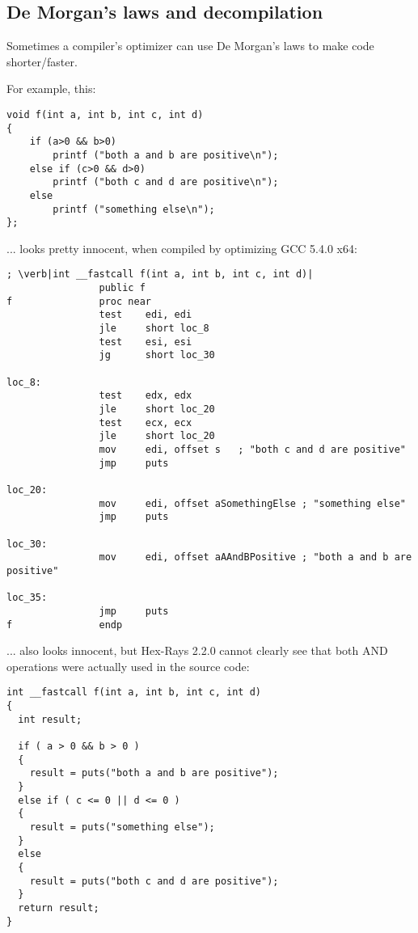 \subsection{De Morgan's laws and decompilation}

Sometimes a compiler's optimizer can use De Morgan's laws to make code shorter/faster.

For example, this:

\begin{lstlisting}[style=customc]
void f(int a, int b, int c, int d)
{
	if (a>0 && b>0)
		printf ("both a and b are positive\n");
	else if (c>0 && d>0)
		printf ("both c and d are positive\n");
	else
		printf ("something else\n");
};
\end{lstlisting}

... looks pretty innocent, when compiled by optimizing GCC 5.4.0 x64:

\begin{lstlisting}[style=customasmx86]
; \verb|int __fastcall f(int a, int b, int c, int d)|
                public f
f               proc near
                test    edi, edi
                jle     short loc_8
                test    esi, esi
                jg      short loc_30

loc_8:
                test    edx, edx
                jle     short loc_20
                test    ecx, ecx
                jle     short loc_20
                mov     edi, offset s   ; "both c and d are positive"
                jmp     puts

loc_20:
                mov     edi, offset aSomethingElse ; "something else"
                jmp     puts

loc_30:
                mov     edi, offset aAAndBPositive ; "both a and b are positive"

loc_35:
                jmp     puts
f               endp
\end{lstlisting}

... also looks innocent, but Hex-Rays 2.2.0 cannot clearly see that both AND operations were actually used in the source code:

\begin{lstlisting}[style=customc]
int __fastcall f(int a, int b, int c, int d)
{
  int result;

  if ( a > 0 && b > 0 )
  {
    result = puts("both a and b are positive");
  }
  else if ( c <= 0 || d <= 0 )
  {
    result = puts("something else");
  }
  else
  {
    result = puts("both c and d are positive");
  }
  return result;
}
\end{lstlisting}

